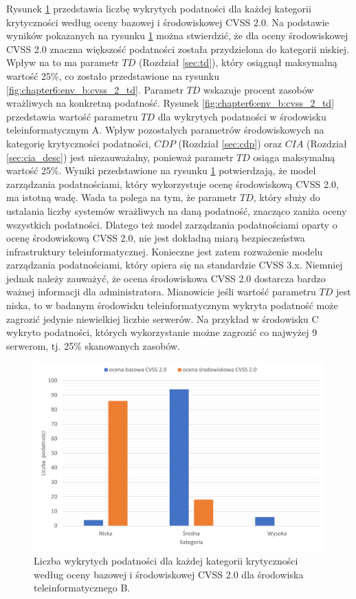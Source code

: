 Rysunek \ref{fig:chapter6:env_b:cvss_2} przedstawia liczbę wykrytych podatności dla każdej kategorii krytyczności według oceny bazowej i środowiskowej CVSS 2.0. Na podstawie wyników pokazanych na rysunku \ref{fig:chapter6:env_b:cvss_2} można stwierdzić, że dla oceny środowiskowej CVSS 2.0 znaczna większość podatności została przydzielona do kategorii niskiej. Wpływ na to ma parametr $TD$ (Rozdział \ref{sec:td}), który osiągnął maksymalną wartość 25\%, co zostało przedstawione na rysunku \ref{fig:chapter6:env_b:cvss_2_td}. Parametr $TD$ wskazuje procent zasobów wrażliwych na konkretną podatność. Rysunek \ref{fig:chapter6:env_b:cvss_2_td} przedstawia wartość parametru $TD$ dla wykrytych podatności w środowisku teleinformatycznym A. Wpływ pozostałych parametrów środowiskowych na kategorię krytyczności podatności, $CDP$ (Rozdział \ref{sec:cdp}) oraz $CIA$ (Rozdział \ref{sec:cia_desc}) jest niezauważalny, ponieważ parametr $TD$ osiąga maksymalną wartość 25\%. Wyniki przedstawione na rysunku \ref{fig:chapter6:env_b:cvss_2} potwierdzają, że model zarządzania podatnościami, który wykorzystuje ocenę środowiskową CVSS 2.0, ma istotną wadę. Wada ta polega na tym, że parametr $TD$, który służy do ustalania liczby systemów wrażliwych na daną podatność, znacząco zaniża oceny wszystkich podatności. Dlatego też model zarządzania podatnościami oparty o ocenę środowiskową CVSS 2.0, nie jest dokładną miarą bezpieczeństwa infrastruktury teleinformatycznej. Konieczne jest zatem rozważenie modelu zarządzania podatnościami, który opiera się na standardzie CVSS 3.x. Niemniej jednak należy zauważyć, że ocena środowiskowa CVSS 2.0 dostarcza bardzo ważnej informacji dla administratora. Mianowicie jeśli wartość parametru $TD$ jest niska, to w badanym środowisku teleinformatycznym wykryta podatność może zagrozić jedynie niewielkiej liczbie serwerów. Na przykład w środowisku C wykryto podatności, których wykorzystanie możne zagrozić co najwyżej 9 serwerom, tj. 25\% skanowanych zasobów.

\begin{figure}[!ht]
\centering
\includegraphics[width=.9\textwidth]{Chapters/Eksperymenty/env_B_results/cvss_2.pdf}
\caption{Liczba wykrytych podatności dla każdej kategorii krytyczności według oceny bazowej i środowiskowej CVSS 2.0 dla środowiska teleinformatycznego B.}
\label{fig:chapter6:env_b:cvss_2}
\end{figure}

